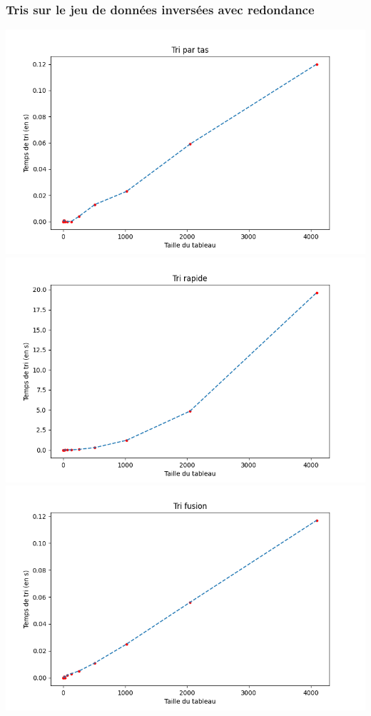 \documentclass[11pt,a4paper]{article}
\begin{document}
\subsubsection{Tris sur le jeu de données inversées avec redondance}
    \includegraphics[scale = 0.7]{../Courbes/Valeurs_triées_inversement_avec_répétitions/Tri par tas.png}
    \includegraphics[scale = 0.7]{../Courbes/Valeurs_triées_inversement_avec_répétitions/Tri rapide.png}
    \includegraphics[scale = 0.7]{../Courbes/Valeurs_triées_inversement_avec_répétitions/Tri fusion.png}
\end{document}
